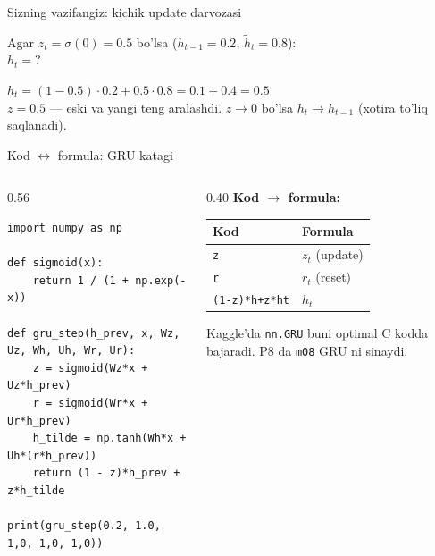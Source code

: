 \documentclass[aspectratio=169,11pt]{beamer}
\begin{document}
\begin{frame}{Sizning vazifangiz: kichik update darvozasi}
  \begin{tcolorbox}[warnbox,title=Savol --- 60 soniya]
    \small
    Agar $z_t=\sigma(0)=0.5$ bo'lsa ($h_{t-1}=0.2$, $\tilde{h}_t=0.8$):\\[4pt]
    \textbf{\large $h_t = ?$}
  \end{tcolorbox}
  \pause
  \begin{tcolorbox}[okbox,title=Javob]
    \small
    $h_t = (1-0.5){\cdot}0.2 + 0.5{\cdot}0.8 = 0.1 + 0.4 = \mathbf{0.5}$\\[3pt]
    \footnotesize $z=0.5$ --- eski va yangi teng aralashdi. $z\to 0$ bo'lsa
    $h_t\to h_{t-1}$ (xotira to'liq saqlanadi).
  \end{tcolorbox}
\end{frame}

\begin{frame}[fragile]{Kod $\leftrightarrow$ formula: GRU katagi}
  \begin{columns}[T]
    \begin{column}{0.56\textwidth}
\begin{lstlisting}
import numpy as np

def sigmoid(x):
    return 1 / (1 + np.exp(-x))

def gru_step(h_prev, x, Wz, Uz, Wh, Uh, Wr, Ur):
    z = sigmoid(Wz*x + Uz*h_prev)
    r = sigmoid(Wr*x + Ur*h_prev)
    h_tilde = np.tanh(Wh*x + Uh*(r*h_prev))
    return (1 - z)*h_prev + z*h_tilde

print(gru_step(0.2, 1.0, 1,0, 1,0, 1,0))
\end{lstlisting}
    \end{column}
    \begin{column}{0.40\textwidth}
      \textbf{Kod $\to$ formula:}\\[3pt]
      \footnotesize
      \begin{tabular}{p{2.0cm}p{2.0cm}}
        \toprule
        Kod & Formula \\
        \midrule
        \texttt{z} & $z_t$ (update) \\
        \texttt{r} & $r_t$ (reset) \\
        \texttt{(1-z)*h+z*ht} & $h_t$ \\
        \bottomrule
      \end{tabular}
      \vspace{4pt}
      \begin{tcolorbox}[okbox,top=2pt,bottom=2pt]
        \footnotesize
        Kaggle'da \texttt{nn.GRU} buni optimal C kodda bajaradi. P8 da
        \texttt{m08} GRU ni sinaydi.
      \end{tcolorbox}
    \end{column}
  \end{columns}
\end{frame}
\end{document}
